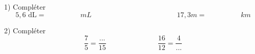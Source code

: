 \begin{exercicebox}
    1) Compléter
    $$5,6\text{ dL} = \hspace{2cm}mL \hspace{5cm} 17,3m = \hspace{2cm}km$$

    2) Compléter
    $$\frac{7}{5} = \frac{...}{15} \hspace{3cm}\frac{16}{12} = \frac{4}{...}$$
\end{exercicebox}


